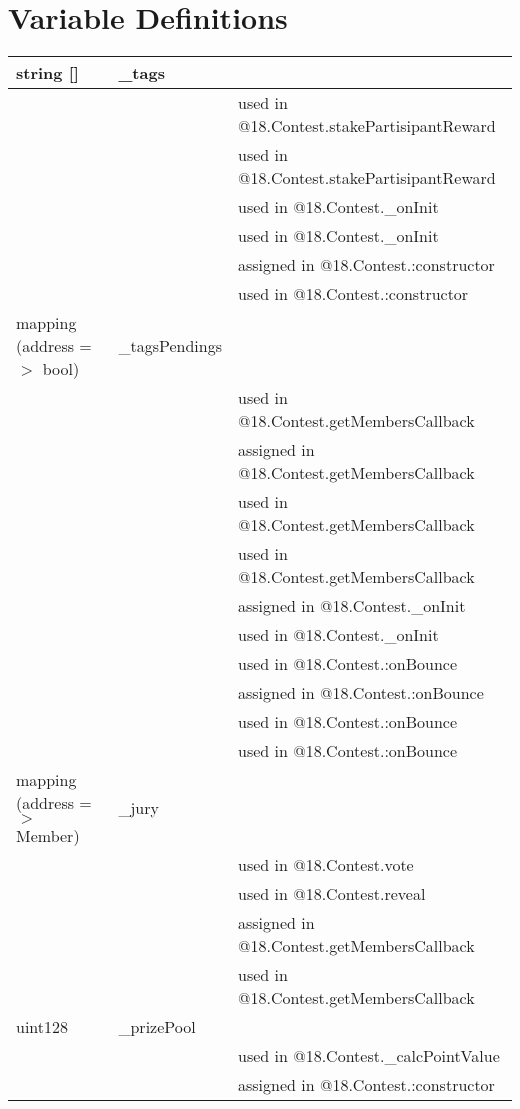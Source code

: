\section{Variable Definitions}


\ifsoltables
\noindent\begin{tabular}{|l|l|p{5cm}|}\hline
string [] & \_{}tags &  \\\hline
 & & used in @18.Contest.stakePartisipantReward\\\hline
 & & used in @18.Contest.stakePartisipantReward\\\hline
 & & used in @18.Contest.\_{}onInit\\\hline
 & & used in @18.Contest.\_{}onInit\\\hline
 & & assigned in @18.Contest.:constructor\\\hline
 & & used in @18.Contest.:constructor\\\hline
mapping (address =$>$ bool) & \_{}tagsPendings &  \\\hline
 & & used in @18.Contest.getMembersCallback\\\hline
 & & assigned in @18.Contest.getMembersCallback\\\hline
 & & used in @18.Contest.getMembersCallback\\\hline
 & & used in @18.Contest.getMembersCallback\\\hline
 & & assigned in @18.Contest.\_{}onInit\\\hline
 & & used in @18.Contest.\_{}onInit\\\hline
 & & used in @18.Contest.:onBounce\\\hline
 & & assigned in @18.Contest.:onBounce\\\hline
 & & used in @18.Contest.:onBounce\\\hline
 & & used in @18.Contest.:onBounce\\\hline
mapping (address =$>$ Member) & \_{}jury &  \\\hline
 & & used in @18.Contest.vote\\\hline
 & & used in @18.Contest.reveal\\\hline
 & & assigned in @18.Contest.getMembersCallback\\\hline
 & & used in @18.Contest.getMembersCallback\\\hline
uint128 & \_{}prizePool &  \\\hline
 & & used in @18.Contest.\_{}calcPointValue\\\hline
 & & assigned in @18.Contest.:constructor\\\hline

\end{tabular}
